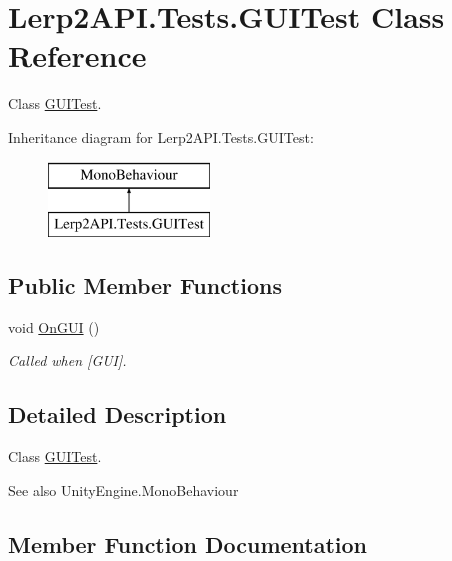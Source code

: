 \hypertarget{class_lerp2_a_p_i_1_1_tests_1_1_g_u_i_test}{}\section{Lerp2\+A\+P\+I.\+Tests.\+G\+U\+I\+Test Class Reference}
\label{class_lerp2_a_p_i_1_1_tests_1_1_g_u_i_test}


Class \hyperlink{class_lerp2_a_p_i_1_1_tests_1_1_g_u_i_test}{G\+U\+I\+Test}.  


Inheritance diagram for Lerp2\+A\+P\+I.\+Tests.\+G\+U\+I\+Test\+:\begin{figure}[H]
\begin{center}
\leavevmode
\includegraphics[height=2.000000cm]{class_lerp2_a_p_i_1_1_tests_1_1_g_u_i_test}
\end{center}
\end{figure}
\subsection*{Public Member Functions}
\begin{DoxyCompactItemize}
\item 
void \hyperlink{class_lerp2_a_p_i_1_1_tests_1_1_g_u_i_test_ac2702665896e01cc25b7ec91fd6c4f74}{On\+G\+UI} ()
\begin{DoxyCompactList}\small\item\em Called when \mbox{[}G\+UI\mbox{]}. \end{DoxyCompactList}\end{DoxyCompactItemize}


\subsection{Detailed Description}
Class \hyperlink{class_lerp2_a_p_i_1_1_tests_1_1_g_u_i_test}{G\+U\+I\+Test}. 

\begin{DoxySeeAlso}{See also}
Unity\+Engine.\+Mono\+Behaviour


\end{DoxySeeAlso}


\subsection{Member Function Documentation}
\mbox{\label{class_lerp2_a_p_i_1_1_tests_1_1_g_u_i_test_ac2702665896e01cc25b7ec91fd6c4f74}} 
